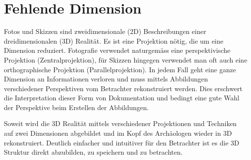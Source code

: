 			
	\section{Fehlende Dimension}
		Fotos und Skizzen sind zweidimensionale (2D) Beschreibungen einer dreidimensionalen (3D) Realität. Es ist eine Projektion nötig, die um eine Dimension reduziert. Fotografie verwendet naturgemäss eine perspektivische Projektion (Zentralprojektion), für Skizzen hingegen verwendet man oft auch eine orthographische Projektion (Parallelprojektion).
		In jedem Fall geht eine ganze Dimension an Informationen verloren und muss mittels Abbildungen verschiedener Perspektiven vom Betrachter rekonstruiert werden.
		Dies erschwert die Interpretation dieser Form von Dokumentation und bedingt eine gute Wahl der Perspektive beim Erstellen der Abbildungen.
		
		Soweit wird die 3D Realität mittels verschiedener Projektionen und Techniken auf zwei Dimensionen abgebildet und im Kopf des Archäologen wieder in 3D rekonstruiert.
		Deutlich einfacher und intuitiver für den Betrachter ist es die 3D Struktur direkt abzubilden, zu speichern und zu betrachten.